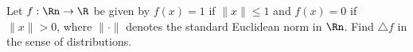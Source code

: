 Let $f:\Rn\rightarrow \R$ be given by $f(x)=1$ if $\|x\|\leq 1$ and
$f(x)=0$ if $\|x\|>0$, where $\|\cdot\|$ denotes the standard
Euclidean norm in $\Rn$. Find $\triangle f$ in the sense of
distributions.
